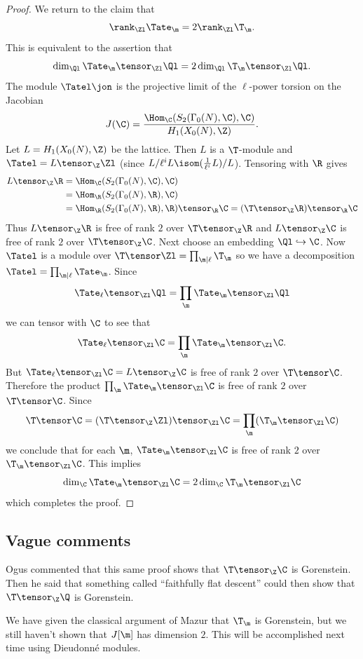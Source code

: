 \documentclass{report}
\begin{document}
\begin{proof}
We return to the claim that
$$\rank_{\Zl}\Tate_\m=2\rank_{\Zl}\T_\m.$$
This is equivalent to the assertion that
$$\dim_{\Ql}\Tate_{\m}\tensor_{\Zl}\Ql=2\dim_{\Ql}\T_\m\tensor_{\Zl}\Ql.$$
The module $\Tatel\jon$ is the projective limit of the $\ell$-power
torsion on the Jacobian
$$J(\C)=\frac{\Hom_{\C}(S_2(\Gamma_0(N),\C),\C)}{H_1(X_0(N),\Z)}.$$
Let $L=H_1(X_0(N),\Z)$ be the lattice. Then $L$ is a $\T$-module and
$\Tatel=L\tensor_{\Z}\Zl$ (since $L/\ell^iL\isom(\frac{1}{\ell^i}L)/L$).
Tensoring with $\R$ gives
\begin{align*}
L\tensor_{\Z}\R&=\Hom_{\C}(S_2(\Gamma_0(N),\C),\C)\\
               &=\Hom_{\R}(S_2(\Gamma_0(N),\R),\C)\\
               &=\Hom_{\R}(S_2(\Gamma_0(N),\R),\R)\tensor_{\R}\C=(\T\tensor_{\Z}\R)\tensor_{\R}\C
\end{align*}
Thus $L\tensor_{\Z}\R$ is free of rank $2$ over $\T\tensor_{\Z}\R$
and $L\tensor_{\Z}\C$ is free of rank $2$ over $\T\tensor_{\Z}\C$.
Next choose an embedding $\Ql\hookrightarrow\C$.
Now $\Tatel$ is a module over $\T\tensor\Zl=\prod_{\m|\ell}\T_\m$
so we have a decomposition $\Tatel=\prod_{\m|\ell}\Tate_\m$. Since
$$\Tate_{\ell}\tensor_{\Zl}\Ql=\prod_{\m}\Tate_\m\tensor_{\Zl}\Ql$$
we can tensor with $\C$ to see that
$$\Tate_{\ell}\tensor_{\Zl}\C=\prod_{\m}\Tate_\m\tensor_{\Zl}\C.$$
But $\Tate_{\ell}\tensor_{\Zl}\C=L\tensor_{\Z}\C$
is free of rank $2$ over $\T\tensor\C$. Therefore
the product $\prod_{\m}\Tate_\m\tensor_{\Zl}\C$
is free of rank $2$ over $\T\tensor\C$. Since
$$\T\tensor\C=(\T\tensor_{\Z}\Zl)\tensor_{\Zl}\C
      =\prod_{\m}(\T_\m\tensor_{\Zl}\C)$$
we conclude that for each $\m$, $\Tate_\m\tensor_{\Zl}\C$
is free of rank $2$ over $\T_\m\tensor_{\Zl}\C$.
This implies
$$\dim_{\C}\Tate_{\m}\tensor_{\Zl}\C=2\dim_{\C}\T_{\m}\tensor_{\Zl}\C$$
which completes the proof.
\end{proof}

\subsection{Vague comments}
Ogus commented that this same proof shows that
$\T\tensor_{\Z}\C$ is Gorenstein. Then he said
that something called ``faithfully flat descent''
could then show that $\T\tensor_{\Z}\Q$ is Gorenstein.

We have given the classical argument of Mazur that
$\T_\m$ is Gorenstein, but we still haven't shown
that $J[\m]$ has dimension $2$. This will be accomplished
next time using Dieudonn\'{e} modules.
\end{document}
